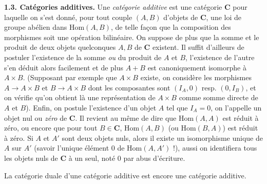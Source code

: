
\noindent\textbf{1.3. Catégories additives.}
Une \textit{catégorie additive} est une catégorie $\mathbf{C}$ pour laquelle on s'est
donné, pour tout couple $(A,B)$ d'objets de $\mathbf{C}$, une loi de groupe abélien dans
$\mathrm{Hom}(A,B)$, de telle façon que la composition des morphismes soit une
opération bilinéaire.
On suppose de plus que la somme et le produit de deux objets quelconques $A,B$
de $\mathbf{C}$ existent. Il suffit d'ailleurs de postuler l'existence de la somme
\textit{ou} du produit de $A$ et $B$, l'existence de l'autre s'en déduit alors
facilement et de plus $A+B$ est canoniquement isomorphe à $A\times B$.
(Supposant par exemple que $A\times B$ existe, on considère les morphismes
$A\to A\times B$ et $B\to A\times B$ dont les
composantes sont $(I_A,0)$ resp. $(0,I_B)$, et on vérifie qu'on obtient là une
représentation de $A\times B$ comme somme directe de $A$ et $B$). Enfin, on
postule l'existence d'un objet $A$ tel que $I_A=0$, on l'appelle un
objet nul ou \textit{zéro} de $\mathbf{C}$. Il revient au même de dire que
$\mathrm{Hom}(A,A)$ est réduit à zéro, ou encore que pour tout $B\in\mathbf{C}$,
$\mathrm{Hom}(A,B)$ (ou $\mathrm{Hom}(B,A)$) est réduit à zéro. Si $A$ et $A'$
sont deux objets nuls, alors il existe un isomorphisme unique de $A$ sur $A'$
(savoir l'unique élément $0$ de $\mathrm{Hom}(A,A')$ !), aussi on identifiera
tous les objets nuls de $\mathbf{C}$ à un seul, noté $0$ par abus d'écriture.

La catégorie duale d'une catégorie additive est encore une catégorie additive.


